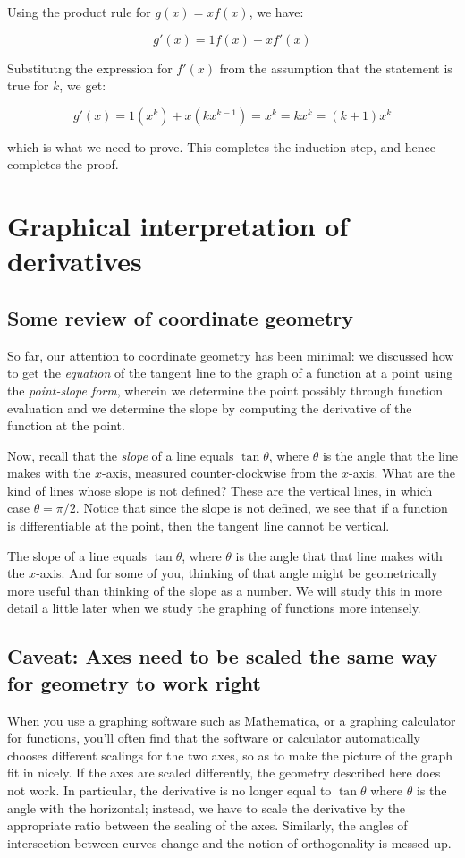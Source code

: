 \documentclass[10pt]{amsart}
\begin{document}
Using the product rule for $g(x) = xf(x)$, we have:

$$g'(x) = 1f(x) + xf'(x)$$

Substitutng the expression for $f'(x)$ from the assumption that the
statement is true for $k$, we get:

$$g'(x) = 1(x^k) + x(kx^{k-1}) = x^k = kx^k = (k+1)x^k$$

which is what we need to prove. This completes the induction step, and
hence completes the proof.

\section{Graphical interpretation of derivatives}

\subsection{Some review of coordinate geometry}

So far, our attention to coordinate geometry has been minimal: we
discussed how to get the {\em equation} of the tangent line to the
graph of a function at a point using the {\em point-slope form},
wherein we determine the point possibly through function evaluation
and we determine the slope by computing the derivative of the function
at the point.

Now, recall that the {\em slope} of a line equals $\tan \theta$, where
$\theta$ is the angle that the line makes with the $x$-axis, measured
counter-clockwise from the $x$-axis. What are the kind of lines whose
slope is not defined? These are the vertical lines, in which case
$\theta = \pi/2$. Notice that since the slope is not defined, we see
that if a function is differentiable at the point, then the tangent
line cannot be vertical.

The slope of a line equals $\tan \theta$, where $\theta$ is
the angle that that line makes with the $x$-axis. And for some of you,
thinking of that angle might be geometrically more useful than
thinking of the slope as a number. We will study this in more detail a
little later when we study the graphing of functions more intensely.

\subsection*{Caveat: Axes need to be scaled the same way for geometry to work right}

When you use a graphing software such as Mathematica, or a graphing
calculator for functions, you'll often find that the software or
calculator automatically chooses different scalings for the two axes,
so as to make the picture of the graph fit in nicely. If the axes are
scaled differently, the geometry described here does not work. In
particular, the derivative is no longer equal to $\tan \theta$ where
$\theta$ is the angle with the horizontal; instead, we have to scale
the derivative by the appropriate ratio between the scaling of the
axes. Similarly, the angles of intersection between curves change and
the notion of orthogonality is messed up.
\end{document}
